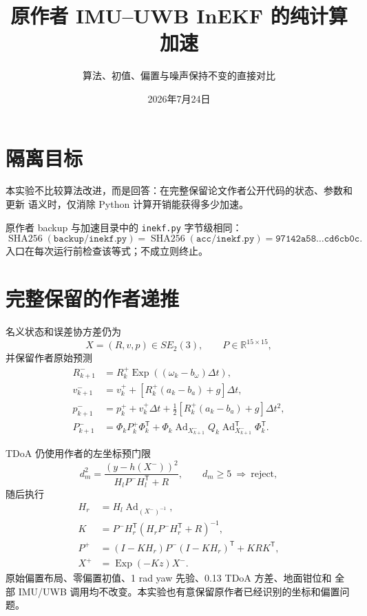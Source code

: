 \documentclass[11pt,a4paper]{ctexart}
\title{原作者 IMU--UWB InEKF 的纯计算加速}
\author{算法、初值、偏置与噪声保持不变的直接对比}
\date{2026年7月24日}
\begin{document}
\maketitle
\pagestyle{plain}

\section{隔离目标}

本实验不比较算法改进，而是回答：在完整保留论文作者公开代码的状态、参数和更新
语义时，仅消除 Python 计算开销能获得多少加速。

原作者 backup 与加速目录中的 \texttt{inekf.py} 字节级相同：
\begin{equation}
\operatorname{SHA256}(\texttt{backup/inekf.py})
=
\operatorname{SHA256}(\texttt{acc/inekf.py})
=\texttt{97142a58\ldots cd6cb0c}.
\end{equation}
入口在每次运行前检查该等式；不成立则终止。

\section{完整保留的作者递推}

名义状态和误差协方差仍为
\begin{equation}
 X=(R,v,p)\in SE_2(3),\qquad P\in\mathbb R^{15\times15},
\end{equation}
并保留作者原始预测
\begin{align}
 R_{k+1}^{-}&=R_k^{+}\operatorname{Exp}
 ((\omega_k-b_{\omega})\Delta t),\\
 v_{k+1}^{-}&=v_k^{+}
 +[R_k^{+}(a_k-b_a)+g]\Delta t,\\
 p_{k+1}^{-}&=p_k^{+}+v_k^{+}\Delta t
 +\frac12[R_k^{+}(a_k-b_a)+g]\Delta t^2,\\
 P_{k+1}^{-}&=\Phi_kP_k^{+}\Phi_k^{\mathsf T}
 +\Phi_k\operatorname{Ad}_{X_{k+1}^{-}}
 Q_k\operatorname{Ad}_{X_{k+1}^{-}}^{\mathsf T}\Phi_k^{\mathsf T}.
\end{align}

TDoA 仍使用作者的左坐标预门限
\begin{equation}
 d_m^2=
 \frac{(y-h(X^-))^2}
 {H_lP^-H_l^{\mathsf T}+R},\qquad
 d_m\ge 5\ \Longrightarrow\ \text{reject},
\end{equation}
随后执行
\begin{align}
 H_r&=H_l\operatorname{Ad}_{(X^-)^{-1}},\\
 K&=P^-H_r^{\mathsf T}
 (H_rP^-H_r^{\mathsf T}+R)^{-1},\\
 P^+&=(I-KH_r)P^-(I-KH_r)^{\mathsf T}+KRK^{\mathsf T},\\
 X^+&=\operatorname{Exp}(-Kz)X^-.
\end{align}
原始偏置布局、零偏置初值、1 rad yaw 先验、0.13 TDoA 方差、地面钳位和
全部 IMU/UWB 调用均不改变。本实验也有意保留原作者已经识别的坐标和偏置问题。
\end{document}
